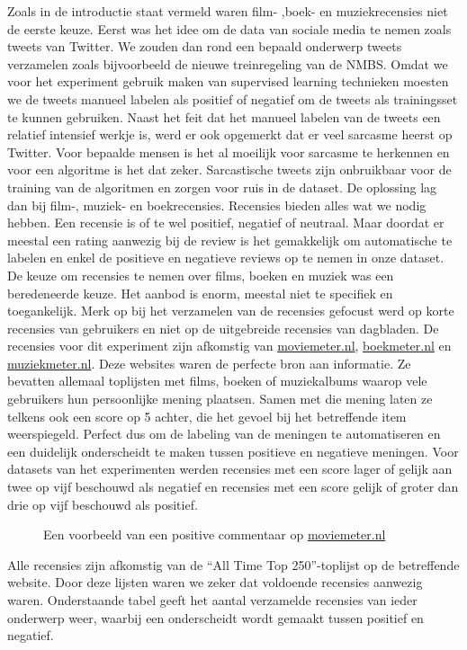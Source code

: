 Zoals in de introductie staat vermeld waren film- ,boek- en muziekrecensies niet de eerste keuze. Eerst was het idee om de data van sociale media te nemen zoals tweets van Twitter. We zouden dan rond een bepaald onderwerp tweets verzamelen zoals bijvoorbeeld de nieuwe treinregeling van de NMBS. Omdat we voor het experiment gebruik maken van supervised learning technieken moesten we de tweets manueel labelen als positief of negatief om de tweets als trainingsset te kunnen gebruiken. Naast het feit dat het manueel labelen van de tweets een relatief intensief werkje is, werd er ook opgemerkt dat er veel sarcasme heerst op Twitter. Voor bepaalde mensen is het al moeilijk voor sarcasme te herkennen en voor een algoritme is het dat zeker. Sarcastische tweets zijn onbruikbaar voor de training van de algoritmen en zorgen voor ruis in de dataset. De oplossing lag dan bij film-, muziek- en boekrecensies. Recensies bieden alles wat we nodig hebben. Een recensie is of te wel positief, negatief of neutraal. Maar doordat er meestal een rating aanwezig bij de review is het gemakkelijk om automatische te labelen en enkel de positieve en negatieve reviews op te nemen in onze dataset. De keuze om recensies te nemen over films, boeken en muziek was een beredeneerde keuze. Het aanbod is enorm, meestal niet te specifiek en toegankelijk. Merk op bij het verzamelen van de recensies gefocust werd op korte recensies van gebruikers en niet op de uitgebreide recensies van dagbladen. De recensies voor dit experiment zijn afkomstig van \url{moviemeter.nl}, \url{boekmeter.nl} en \url{muziekmeter.nl}. Deze websites waren de perfecte bron aan informatie. Ze bevatten allemaal toplijsten met films, boeken of muziekalbums waarop vele gebruikers hun persoonlijke mening plaatsen. Samen met die mening laten ze telkens ook een score op 5 achter, die het gevoel bij het betreffende item weerspiegeld. Perfect dus om de labeling van de meningen te automatiseren en een duidelijk onderscheidt te maken tussen positieve en negatieve meningen. Voor datasets van het experimenten werden recensies met een score lager of gelijk aan twee op vijf beschouwd als negatief en recensies met een score gelijk of groter dan drie op vijf beschouwd als positief.
\begin{figure}[h]%
    \centering
    \caption{Een voorbeeld van een positive commentaar op \url{moviemeter.nl}}%
\end{figure}
\newline
Alle recensies zijn afkomstig van de ``All Time Top 250''-toplijst op de betreffende website. Door deze lijsten waren we zeker dat voldoende recensies aanwezig waren. Onderstaande tabel geeft het aantal verzamelde recensies van ieder onderwerp weer, waarbij een onderscheidt wordt gemaakt tussen positief en negatief.\\

